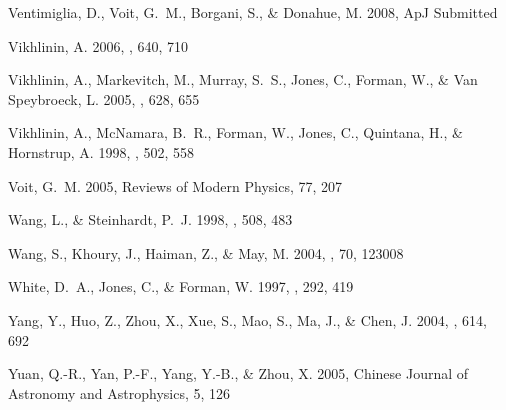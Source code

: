 \documentclass[12pt,preprint]{aastex}
\begin{document}
\begin{thebibliography}{83}
{Ventimiglia}, D., {Voit}, G.~M., {Borgani}, S., \& {Donahue}, M. 2008, ApJ
  Submitted

{Vikhlinin}, A. 2006, \apj, 640, 710

{Vikhlinin}, A., {Markevitch}, M., {Murray}, S.~S., {Jones}, C., {Forman}, W.,
  \& {Van Speybroeck}, L. 2005, \apj, 628, 655

{Vikhlinin}, A., {McNamara}, B.~R., {Forman}, W., {Jones}, C., {Quintana}, H.,
  \& {Hornstrup}, A. 1998, \apj, 502, 558

{Voit}, G.~M. 2005, Reviews of Modern Physics, 77, 207

{Wang}, L., \& {Steinhardt}, P.~J. 1998, \apj, 508, 483

{Wang}, S., {Khoury}, J., {Haiman}, Z., \& {May}, M. 2004, \prd, 70, 123008

{White}, D.~A., {Jones}, C., \& {Forman}, W. 1997, \mnras, 292, 419

{Yang}, Y., {Huo}, Z., {Zhou}, X., {Xue}, S., {Mao}, S., {Ma}, J., \& {Chen},
  J. 2004, \apj, 614, 692

{Yuan}, Q.-R., {Yan}, P.-F., {Yang}, Y.-B., \& {Zhou}, X. 2005, Chinese Journal
  of Astronomy and Astrophysics, 5, 126

\end{thebibliography}

\clearpage


\clearpage



\clearpage


\clearpage

\end{document}
